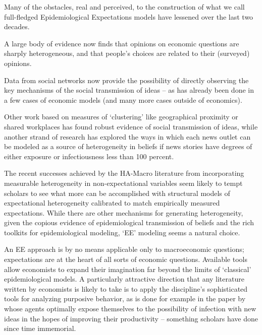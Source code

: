 
\label{conclusion}%

Many of the obstacles, real and perceived, to the construction of what we call full-fledged Epidemiological Expectations models have lessened over the last two decades.

A large body of evidence now finds that opinions on economic questions are sharply heterogeneous, and that people's choices are related to their (surveyed) opinions.

Data from social networks now provide the possibility of directly observing the key mechanisms of the social transmission of ideas -- as  has already been done in a few cases of economic models (and many more cases outside of economics).

Other work based on measures of `clustering' like geographical proximity or shared workplaces has found robust evidence of social transmission of ideas, while another strand of research has explored the ways in which each news outlet can be modeled as a source of heterogeneity in beliefs if news stories have degrees of either exposure or infectiousness less than 100 percent.

The recent successes achieved by the HA-Macro literature from incorporating  measurable  heterogeneity in non-expectational variables seem likely to tempt scholars to see what more can be accomplished with structural models of expectational heterogeneity calibrated to match empirically measured expectations.  While there are other mechanisms for generating heterogeneity, given the copious evidence of epidemiological transmission of beliefs and the rich toolkits for epidemiological modeling, `EE' modeling seems a natural choice.

An EE approach is by no means applicable only to macroeconomic questions; expectations are at the heart of all sorts of economic questions.  Available tools allow economists to expand their imagination far beyond the limits of  `classical' epidemiological models.  A particularly attractive direction that any literature written by economists is likely to take is to apply the discipline's sophisticated tools for analyzing purposive behavior, as is done for example in the paper by~\cite{lucas2014knowledge} whose agents optimally expose themselves to the possibility of infection with new ideas in the hopes of improving their productivity -- something scholars have done since time immemorial.



